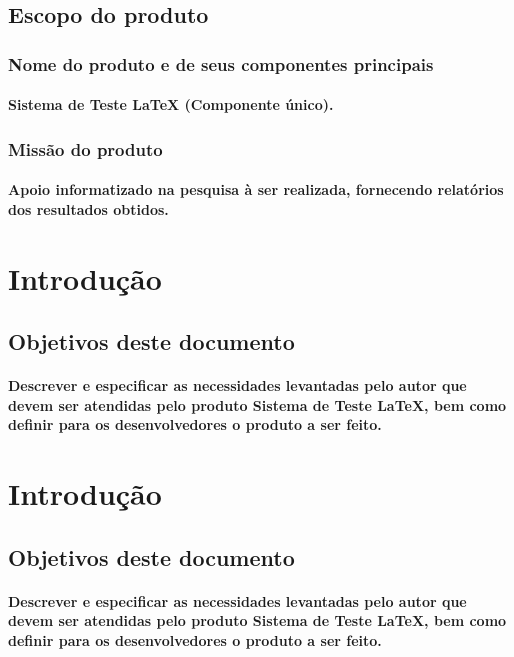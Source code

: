 	\subsection{Escopo do produto}
		\subsubsection{Nome do produto e de seus componentes principais}
			\paragraph{Sistema de Teste LaTeX (Componente único). }
		\subsubsection{Missão do produto}
			\paragraph{Apoio informatizado na pesquisa à ser realizada, fornecendo relatórios dos resultados obtidos.}
			
	
\newpage

\section{Introdução}
	\subsection{Objetivos deste documento}
		\paragraph{Descrever e especificar as necessidades levantadas pelo autor que devem ser atendidas pelo produto Sistema de Teste LaTeX, bem como definir para os desenvolvedores o produto a ser feito.}

\newpage

\section{Introdução}
	\subsection{Objetivos deste documento}
		\paragraph{Descrever e especificar as necessidades levantadas pelo autor que devem ser atendidas pelo produto Sistema de Teste LaTeX, bem como definir para os desenvolvedores o produto a ser feito.}
